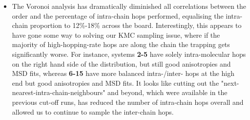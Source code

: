 \documentclass[12pt]{article}
\begin{document}
\begin{itemize}
{}
\item{The Voronoi analysis has dramatically diminished all correlations between the order and the percentage of intra-chain hops performed, equalising the intra-chain proportion to 12\%-18\% across the board.
        Interestingly, this appears to have gone some way to solving our KMC sampling issue, where if the majority of high-hopping-rate hops are along the chain the trapping gets significantly worse.
        For instance, systems \textbf{2-5} have solely intra-molecular hops on the right hand side of the distribution, but still good anisotropies and MSD fits, whereas \textbf{6-15} have more balanced intra-/inter- hops at the high end but good anisotropies and MSD fits.
        It looks like cutting out the "next-nearest-intra-chain-neighbours" and beyond, which were available in the previous cut-off runs, has reduced the number of intra-chain hops overall and allowed us to continue to sample the inter-chain hops.
    }
\end{itemize}
\end{document}
